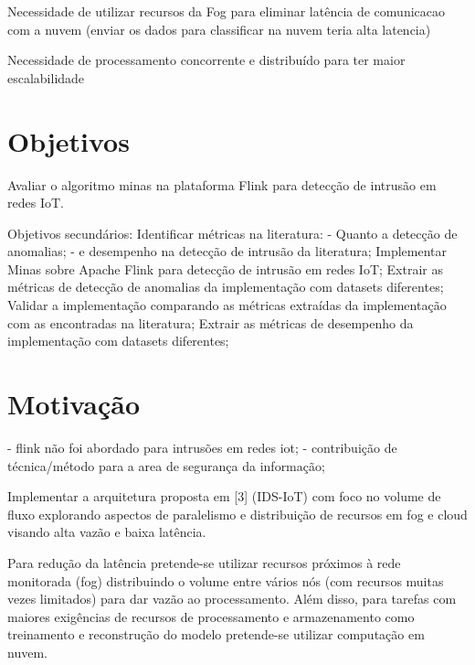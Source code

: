 Necessidade de utilizar recursos da Fog para eliminar latência de comunicacao com a nuvem (enviar os dados para classificar na nuvem teria alta latencia)

Necessidade de processamento concorrente e distribuído para ter maior escalabilidade

\section{Objetivos}

Avaliar o algoritmo minas na plataforma Flink para detecção de intrusão em redes IoT.


Objetivos secundários:
Identificar métricas na literatura:
    - Quanto a detecção de anomalias;
    - e desempenho na detecção de intrusão da literatura;
Implementar Minas sobre Apache Flink para detecção de intrusão em redes IoT;
Extrair as métricas de detecção de anomalias da implementação com datasets diferentes;
Validar a implementação comparando as métricas extraídas da implementação com as encontradas na literatura;
Extrair as métricas de desempenho da implementação com datasets diferentes;

\section{Motivação}
- flink não foi abordado para intrusões em redes iot;
- contribuição de técnica/método para a area de segurança da informação;

Implementar a arquitetura proposta em [3] (IDS-IoT) com foco no volume de fluxo
explorando aspectos de paralelismo e distribuição de recursos em fog e cloud visando
alta vazão e baixa latência.

Para redução da latência pretende-se utilizar recursos próximos à rede monitorada (fog) 
distribuindo o volume entre vários nós (com recursos muitas vezes limitados) para dar
vazão ao processamento. Além disso, para tarefas com maiores exigências de recursos de
processamento e armazenamento como treinamento e reconstrução do modelo pretende-se utilizar computação em nuvem.

